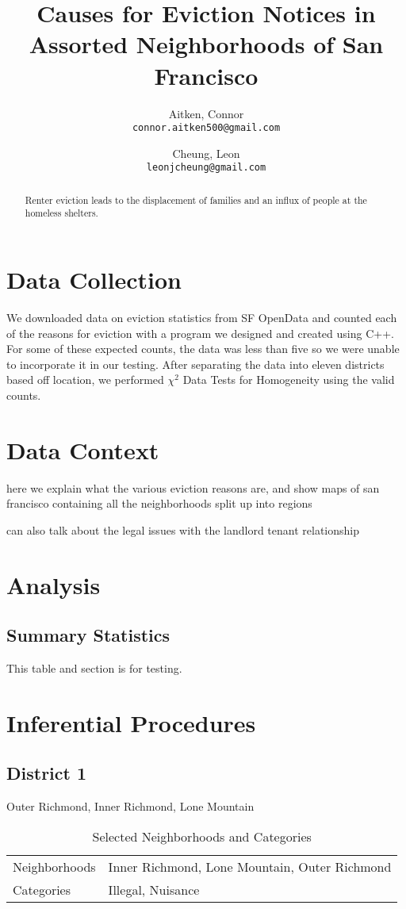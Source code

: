 \documentclass[]{article}
\title{Causes for Eviction Notices in Assorted Neighborhoods of San Francisco}
\author{
Aitken, Connor\\
\texttt{connor.aitken500@gmail.com}
\and
Cheung, Leon\\
\texttt{leonjcheung@gmail.com}
}
\begin{document}
\maketitle

\begin{abstract}
Renter eviction leads to the displacement of families and an influx of people at the homeless shelters.  
\end{abstract}

\section{Data Collection}
We downloaded data on eviction statistics from SF OpenData and counted each of the reasons for eviction with a program we designed and created using C++. For some of these expected counts, the data was less than five so we were unable to incorporate it in our testing. After separating the data into eleven districts based off location, we performed $\chi ^{2}$ Data Tests for Homogeneity using the valid counts.
\section{Data Context}
here we explain what the various eviction reasons are, and show maps of san francisco containing all the neighborhoods split up into regions

can also talk about the legal issues with the landlord tenant relationship
\section{Analysis}
\subsection{Summary Statistics}
This table and section is for testing.

\section{Inferential Procedures}
\subsection{District 1}
Outer Richmond, Inner Richmond, Lone Mountain
\begin{table}[h]
\centering
\begin{tabular}{|l | l|}
Neighborhoods & Inner Richmond, Lone Mountain, Outer Richmond \\
Categories    & Illegal, Nuisance 							  \\
\end{tabular}
\caption{Selected Neighborhoods and Categories}
\end{table}
\FloatBarrier
\end{document}
